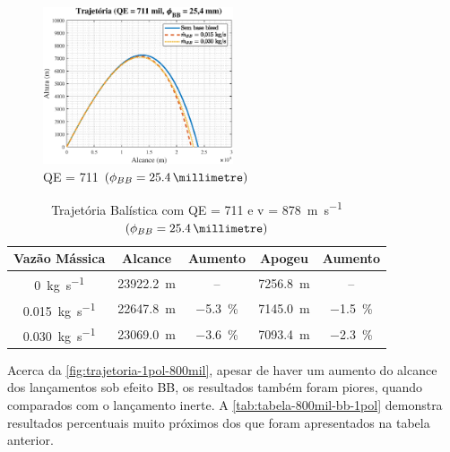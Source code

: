 \begin{figure}[!ht]
	\centering
    \includegraphics[width=0.5\textwidth]{foto1-qe711mil-1pol.eps}
    \caption[QE = \qty{711}{\milliradian} \(\left(\phi_{BB} = \qty{25,4}{\millimetre}\right)\)]{QE = \qty{711}{\milliradian} \(\left(\phi_{BB} = \qty{25,4}{\millimetre}\right)\)}
    \label{fig:trajetoria-1pol-711mil}
\end{figure}

\begin{table}[ht]
\centering
\caption[Trajetória Balística com QE = \qty{711}{\milliradian} e v = \qty{878}{\metre\per\second} \(\left(\phi_{BB} = \qty{25,4}{\millimetre}\right)\)]{Trajetória Balística com QE = \qty{711}{\milliradian} e v = \qty{878}{\metre\per\second} \(\left(\phi_{BB} = \qty{25,4}{\millimetre}\right)\)}
\vspace{0.5cm}
\begin{tabular}{c|c|c|c|c}
Vazão Mássica & Alcance & Aumento & Apogeu & Aumento \\
\hline
\qty{0}{\kilogram\per\second} & \qty{23922,2}{\metre} & -- & \qty{7256,8}{\metre} & -- \\ 
\qty{0,015}{\kilogram\per\second} & \qty{22647,8}{\metre} & \qty{-5,3}{\percent} & \qty{7145,0}{\metre} & \qty{-1,5}{\percent} \\
\qty{0,030}{\kilogram\per\second} & \qty{23069,0}{\metre} & \qty{-3,6}{\percent} & \qty{7093,4}{\metre} & \qty{-2,3}{\percent}
\end{tabular}
\label{tab:tabela-711mil-bb-1pol}
\end{table}

Acerca da \autoref{fig:trajetoria-1pol-800mil}, apesar de haver um aumento do alcance dos lançamentos sob efeito BB, os resultados também foram piores, quando comparados com o lançamento inerte. A \autoref{tab:tabela-800mil-bb-1pol} demonstra resultados percentuais muito próximos dos que foram apresentados na tabela anterior.

